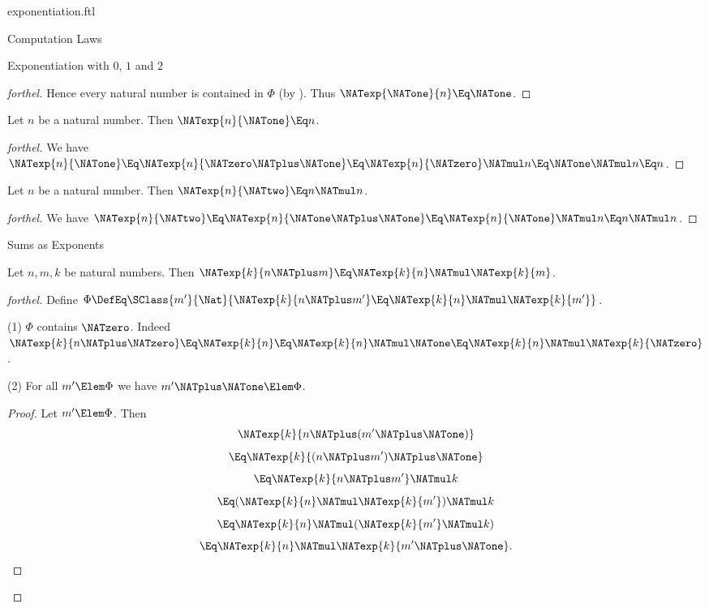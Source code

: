 \documentclass{stex}
\begin{document}
\begin{smodule}{exponentiation.ftl}
\begin{sfragment}{Computation Laws}
\begin{sfragment}{Exponentiation with $0$, $1$ and $2$}
\begin{proof}[forthel]
      Hence every natural number is contained in $\Phi$ (by ).
      Thus $\NATexp{\NATone}{n} \Eq \NATone$.
    \end{proof}

    \begin{proposition}[forthel]
      Let $n$ be a natural number.
      Then $\NATexp{n}{\NATone} \Eq n$.
    \end{proposition}
    \begin{proof}[forthel]
      We have $\NATexp{n}{\NATone}
        \Eq \NATexp{n}{\NATzero \NATplus \NATone}
        \Eq \NATexp{n}{\NATzero} \NATmul n
        \Eq \NATone \NATmul n
        \Eq n$.
    \end{proof}

    \begin{proposition}[forthel]
      Let $n$ be a natural number.
      Then $\NATexp{n}{\NATtwo} \Eq n \NATmul n$.
    \end{proposition}
    \begin{proof}[forthel]
      We have $\NATexp{n}{\NATtwo}
        \Eq \NATexp{n}{\NATone \NATplus \NATone}
        \Eq \NATexp{n}{\NATone} \NATmul n
        \Eq n \NATmul n$.
    \end{proof}
  \end{sfragment}

  \begin{sfragment}{Sums as Exponents}
    \begin{proposition}[forthel]
      Let $n, m, k$ be natural numbers.
      Then $\NATexp{k}{n \NATplus m} \Eq \NATexp{k}{n} \NATmul \NATexp{k}{m}$.
    \end{proposition}
    \begin{proof}[forthel]
      Define $\Phi \DefEq \SClass{m'}{\Nat}{\NATexp{k}{n \NATplus m'} \Eq \NATexp{k}{n} \NATmul \NATexp{k}{m'}}$.

      (1) $\Phi$ contains $\NATzero$.
      Indeed $\NATexp{k}{n \NATplus \NATzero}
        \Eq \NATexp{k}{n}
        \Eq \NATexp{k}{n} \NATmul \NATone
        \Eq \NATexp{k}{n} \NATmul \NATexp{k}{\NATzero}$.

      (2) For all $m' \Elem \Phi$ we have $m' \NATplus \NATone \Elem \Phi$.
      \begin{proof}
        Let $m' \Elem \Phi$.
        Then
        \[  \NATexp{k}{n \NATplus (m' \NATplus \NATone)}                  \]
        \[    \Eq \NATexp{k}{(n \NATplus m') \NATplus \NATone}              \]
        \[    \Eq \NATexp{k}{n \NATplus m'} \NATmul k            \]
        \[    \Eq (\NATexp{k}{n} \NATmul \NATexp{k}{m'}) \NATmul k  \]
        \[    \Eq \NATexp{k}{n} \NATmul (\NATexp{k}{m'} \NATmul k)  \]
        \[    \Eq \NATexp{k}{n} \NATmul \NATexp{k}{m' \NATplus \NATone}.       \]
      \end{proof}


\end{proof}
\end{sfragment}
\end{sfragment}
\end{smodule}
\end{document}
